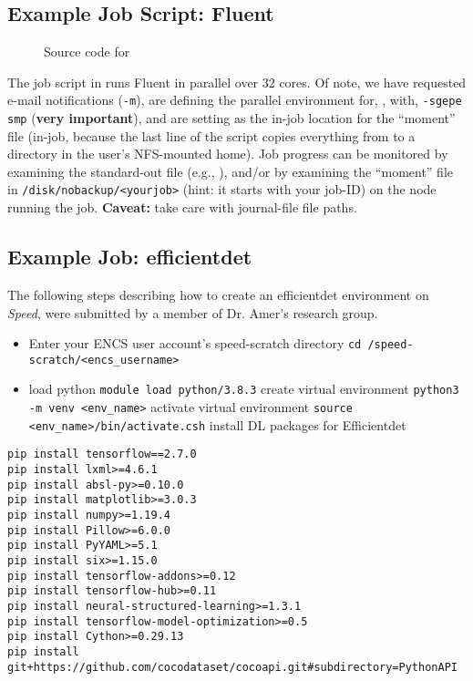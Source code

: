﻿%
\subsection{Example Job Script: Fluent}

\begin{figure}[htpb]
    
    \caption{Source code for }
	\label{fig:fluent.sh}
\end{figure}

The job script in  runs Fluent in parallel over 32 cores. 
Of note, we have requested e-mail notifications (\texttt{-m}), are defining the 
parallel environment for, , with, \texttt{-sgepe smp} (\textbf{very 
important}), and are setting  as the in-job location for the
``moment''  file (in-job, because the last line of the script 
copies everything from  to a directory in the user's NFS-mounted home). 
Job progress can be monitored by examining the standard-out file (e.g.,
), and/or by examining the ``moment'' file in 
\texttt{/disk/nobackup/<yourjob>} (hint: it starts with your job-ID) on the node running
the job. \textbf{Caveat:} take care with journal-file file paths.

\subsection{Example Job: efficientdet}

The following steps describing how to create an efficientdet environment on
\emph{Speed}, were submitted by a member of Dr. Amer's research group.

\begin{itemize}
    \item 
    Enter your ENCS user account's speed-scratch directory 
    \verb!cd /speed-scratch/<encs_username>!
    \item
    load python \verb!module load python/3.8.3!
    create virtual environment \verb!python3 -m venv <env_name>!
    activate virtual environment \verb!source <env_name>/bin/activate.csh!
    install DL packages for Efficientdet
\end{itemize}
\begin{verbatim}
pip install tensorflow==2.7.0
pip install lxml>=4.6.1
pip install absl-py>=0.10.0
pip install matplotlib>=3.0.3
pip install numpy>=1.19.4
pip install Pillow>=6.0.0
pip install PyYAML>=5.1
pip install six>=1.15.0
pip install tensorflow-addons>=0.12
pip install tensorflow-hub>=0.11
pip install neural-structured-learning>=1.3.1
pip install tensorflow-model-optimization>=0.5
pip install Cython>=0.29.13
pip install git+https://github.com/cocodataset/cocoapi.git#subdirectory=PythonAPI
\end{verbatim}

